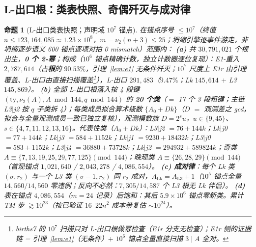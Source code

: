 \documentclass[11pt]{ctexart}
\newtheorem{proposition}[theorem]{命题}
\theoremstyle{definition}
\newcommand{\vtwo}[1]{\nu_2(#1)}
\begin{document}
\subsection{L-出口根：类表快照、奇偶歼灭与成对律}

\begin{proposition}[L-出口类表快照；声明域 $10^7$ 锚点]\label{prop:classes}
在锚点序号 $\le10^7$（终值 $n\le123{,}164{,}085\approx1.23\times10^8$，$m=\vtwo{n+3}\le25$；坍缩引擎逐事件游走，非坍缩逐步语义 600 锚点逐项对拍 0 mismatch）范围内：
\textbf{(a)} 共 $30{,}791{,}021$ 个根出生，\textbf{0 个 2-幂}；构成（$10^6$ 锚点精确计数，独立计数器逐位复现）：E1-重入 $2{,}787{,}614$（占\textbf{根}的 $90.53\%$，引理~\ref{lem:e1} 无条件歼灭；$10^7$ 尺度上 E1r 由引理覆盖、L-出口由直接扫描覆盖\footnote{births7 的 $10^7$ 扫描只对 L-出口根做幂检查（E1r 分支无检查）；E1r 侧的证据链 = 引理~\ref{lem:e1}（无条件）$+$ $10^6$ 锚点全量直接扫描 $3\mid A$ 全对。}），L-出口 $291{,}483$（$9.47\%$；Lk $145{,}614$ $+$ L3 $145{,}869$）。
\textbf{(b)} 全部 L-出口根落入按 4 段键 $(\mathrm{ty},\vtwo{A},A\bmod144,q\bmod144)$ 的 \textbf{20 个类}（$=$ 17 个 3 段粗键；主链 L3$|$j2 按 $q$ 子类拆 4）；每类成员拟合算术级数 $\{A_0+Dk\}$（$D$ $=$ 观测差之 gcd，拟合与全量观测成员一致已独立复核），观测模数族 $D=2^{s}u$，$u\in\{9,45\}$、$s\in\{4,7,11,12,13,16\}$。代表性类（$A_0+Dk$）：L3$|$j2 $=76+144k$；Lk$|$j0 $=77+144k$；Lk$|$j3 $=584+1152k$；Lk$|$j1 $=9230+18432k$；L3$|$j0 $=583+1152k$；L3$|$j4 $=36880+73728k$；Lk$|$j2 $=294932+589824k$；奇类 $A\equiv\{7,13,19,25,29,77,125\}\pmod{144}$；晚现类 $A\equiv\{26,28,29\}\pmod{144}$（首现锚点 $1{,}021{,}640$ / $2{,}043{,}278$ / $4{,}086{,}554$）。
\textbf{(c) 成对律}：每个 Lk 类 $(\sigma,r_2)$ 与一个 L3 类 $(\sigma{-}1,r_2)$ 同 $r_2$ 成对，$A_{\mathrm{Lk}}=A_{\mathrm{L3}}+1$（$10^5$ 锚点全量 $14{,}560/14{,}560$ 零违例；反向不必然：$7{,}305/14{,}587$ 个 L3 根无 Lk 伴侣）。
\textbf{(d)} 表在锚点 $4{,}086{,}554$（$m{=}24$ 记录）后饱和：其后 $5.9\times10^6$ 锚点零新类。累计 TM 步 $\gtrsim10^{23}$（按已验证 $16$--$22n^2$ 成本带复估 $\sim10^{24}$）。
\end{proposition}
\end{document}
